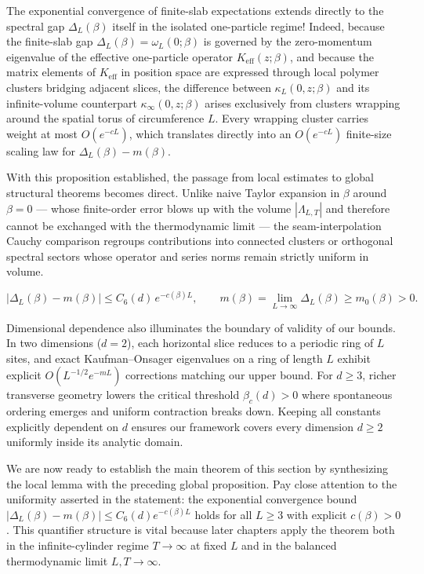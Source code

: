 \documentclass[11pt]{article}
\theoremstyle{definition}
\begin{document}
The exponential convergence of finite-slab expectations extends directly to the
spectral gap $\Delta_L(\beta)$ itself in the isolated one-particle regime! Indeed,
because the finite-slab gap $\Delta_L(\beta) = \omega_L(0; \beta)$ is governed by
the zero-momentum eigenvalue of the effective one-particle operator
$K_{\mathrm{eff}}(z; \beta)$, and because the matrix elements of $K_{\mathrm{eff}}$
in position space are expressed through local polymer clusters bridging adjacent
slices, the difference between $\kappa_L(0, z; \beta)$ and its infinite-volume
counterpart $\kappa_\infty(0, z; \beta)$ arises exclusively from clusters wrapping
around the spatial torus of circumference $L$. Every wrapping cluster carries weight
at most $O(e^{-c L})$, which translates directly into an $O(e^{-c L})$ finite-size
scaling law for $\Delta_L(\beta) - m(\beta)$.

With this proposition established, the passage from local estimates to global
structural theorems becomes direct. Unlike naive Taylor expansion in $\beta$ around
$\beta = 0$ --- whose finite-order error blows up with the volume $|\Lambda_{L,T}|$
and therefore cannot be exchanged with the thermodynamic limit --- the
seam-interpolation Cauchy comparison regroups contributions into connected clusters
or orthogonal spectral sectors whose operator and series norms remain strictly
uniform in volume.

\[
  \bigl|\Delta_L(\beta) - m(\beta)\bigr| \le C_6(d) \, e^{-c(\beta) L}, \qquad m(\beta) = \lim_{L \to \infty} \Delta_L(\beta) \ge m_0(\beta) > 0.
\]

Dimensional dependence also illuminates the boundary of validity of our bounds. In
two dimensions ($d = 2$), each horizontal slice reduces to a periodic ring of $L$
sites, and exact Kaufman--Onsager eigenvalues on a ring of length $L$ exhibit
explicit $O(L^{-1/2} e^{-m L})$ corrections matching our upper bound. For $d \ge 3$,
richer transverse geometry lowers the critical threshold $\beta_c(d) > 0$ where
spontaneous ordering emerges and uniform contraction breaks down. Keeping all
constants explicitly dependent on $d$ ensures our framework covers every dimension
$d \ge 2$ uniformly inside its analytic domain.

We are now ready to establish the main theorem of this section by synthesizing the
local lemma with the preceding global proposition. Pay close attention to the
uniformity asserted in the statement: the exponential convergence bound
$|\Delta_L(\beta) - m(\beta)| \le C_6(d) e^{-c(\beta) L}$ holds for all $L \ge 3$
with explicit $c(\beta) > 0$. This quantifier structure is vital because later
chapters apply the theorem both in the infinite-cylinder regime $T \to \infty$ at
fixed $L$ and in the balanced thermodynamic limit $L, T \to \infty$.
\end{document}
